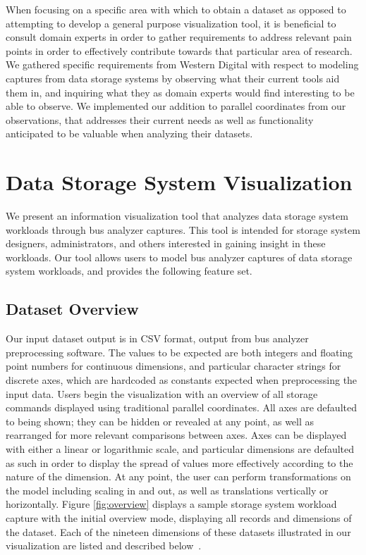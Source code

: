 \documentclass[journal]{vgtc}                %
\begin{document}
When focusing on a specific area with which to obtain a dataset as opposed to attempting to develop a general purpose visualization tool, it is beneficial to consult domain experts in order to gather requirements to address relevant pain points in order to effectively contribute towards that particular area of research. We gathered specific requirements from Western Digital with respect to modeling captures from data storage systems by observing what their current tools aid them in, and inquiring what they as domain experts would find interesting to be able to observe. We implemented our addition to parallel coordinates from our observations, that addresses their current needs as well as functionality anticipated to be valuable when analyzing their datasets.

\section{Data Storage System Visualization}
\label{data-storage-system-visualization}

We present an information visualization tool that analyzes data storage system workloads through bus analyzer captures. This tool is intended for storage system designers, administrators, and others interested in gaining insight in these workloads. Our tool allows users to model bus analyzer captures of data storage system workloads, and provides the following feature set.

\subsection{Dataset Overview}
Our input dataset output is in CSV format, output from bus analyzer preprocessing software. The values to be expected are both integers and floating point numbers for continuous dimensions, and particular character strings for discrete axes, which are hardcoded as constants expected when preprocessing the input data. Users begin the visualization with an overview of all storage commands displayed using traditional parallel coordinates. All axes are defaulted to being shown; they can be hidden or revealed at any point, as well as rearranged for more relevant comparisons between axes. Axes can be displayed with either a linear or logarithmic scale, and particular dimensions are defaulted as such in order to display the spread of values more effectively according to the nature of the dimension. At any point, the user can perform transformations on the model including scaling in and out, as well as translations vertically or horizontally. Figure \ref{fig:overview} displays a sample storage system workload capture with the initial overview mode, displaying all records and dimensions of the dataset. Each of the nineteen dimensions of these datasets illustrated in our visualization are listed and described below~\cite{internal:requirements}.
\end{document}
